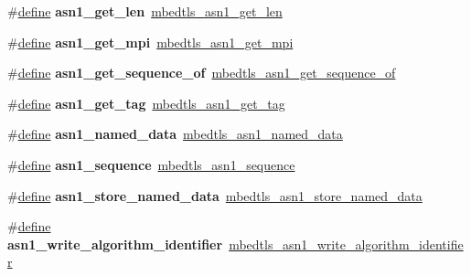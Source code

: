 \begin{DoxyCompactItemize}
\#\hyperlink{structdefine}{define} {\bfseries asn1\+\_\+get\+\_\+len}~\hyperlink{asn1_8h_ad45c1d0ed3694fe903342cb32647bfb1}{mbedtls\+\_\+asn1\+\_\+get\+\_\+len}
\item 
\mbox{\label{compat-1_83_8h_a9c448bb0b286fb619c5875aea50be802}} 
\#\hyperlink{structdefine}{define} {\bfseries asn1\+\_\+get\+\_\+mpi}~\hyperlink{asn1_8h_a48e235454b64aa67c9472a6579706b05}{mbedtls\+\_\+asn1\+\_\+get\+\_\+mpi}
\item 
\mbox{\label{compat-1_83_8h_a2219e200e06da45e44553075123686c4}} 
\#\hyperlink{structdefine}{define} {\bfseries asn1\+\_\+get\+\_\+sequence\+\_\+of}~\hyperlink{asn1_8h_a872d62128956b3574bb0e681536c0d6b}{mbedtls\+\_\+asn1\+\_\+get\+\_\+sequence\+\_\+of}
\item 
\mbox{\label{compat-1_83_8h_add5e2510dd9b89b7be429afe38c7b081}} 
\#\hyperlink{structdefine}{define} {\bfseries asn1\+\_\+get\+\_\+tag}~\hyperlink{asn1_8h_ae8d7dd42a3b99b61d2ef60bc0c2eaf0d}{mbedtls\+\_\+asn1\+\_\+get\+\_\+tag}
\item 
\mbox{\label{compat-1_83_8h_a80ef3a4a6900d569afa2450c35cf65ab}} 
\#\hyperlink{structdefine}{define} {\bfseries asn1\+\_\+named\+\_\+data}~\hyperlink{structmbedtls__asn1__named__data}{mbedtls\+\_\+asn1\+\_\+named\+\_\+data}
\item 
\mbox{\label{compat-1_83_8h_ac1ed137fa8bb27403fa3cfb8b640aa4c}} 
\#\hyperlink{structdefine}{define} {\bfseries asn1\+\_\+sequence}~\hyperlink{structmbedtls__asn1__sequence}{mbedtls\+\_\+asn1\+\_\+sequence}
\item 
\mbox{\label{compat-1_83_8h_a6ffe8c9825de3265298a4d2fab723440}} 
\#\hyperlink{structdefine}{define} {\bfseries asn1\+\_\+store\+\_\+named\+\_\+data}~\hyperlink{asn1write_8h_a0ad16ddefc9aa0948e84dcdd1e29ebf6}{mbedtls\+\_\+asn1\+\_\+store\+\_\+named\+\_\+data}
\item 
\mbox{\label{compat-1_83_8h_ae8457947de0fbbed4e78dafef2a99be2}} 
\#\hyperlink{structdefine}{define} {\bfseries asn1\+\_\+write\+\_\+algorithm\+\_\+identifier}~\hyperlink{asn1write_8h_a87b24d328654c5e8d17ffe3b0192ecb8}{mbedtls\+\_\+asn1\+\_\+write\+\_\+algorithm\+\_\+identifier}
\item 

\end{DoxyCompactItemize}
